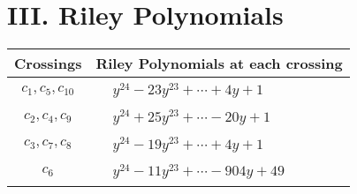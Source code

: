 \documentclass[1p]{elsarticle_modified}
\theoremstyle{definition}
\begin{document}
\centering \section*{ III. Riley Polynomials}
\begin{tabular}{m{50pt}|m{274pt}}
Crossings & \hspace{64pt}Riley Polynomials at each crossing \\
\hline $$\begin{aligned}c_{1},c_{5},c_{10}\end{aligned}$$&$\begin{aligned}
&y^{24}-23 y^{23}+\cdots+4 y+1
\end{aligned}$\\
\hline $$\begin{aligned}c_{2},c_{4},c_{9}\end{aligned}$$&$\begin{aligned}
&y^{24}+25 y^{23}+\cdots-20 y+1
\end{aligned}$\\
\hline $$\begin{aligned}c_{3},c_{7},c_{8}\end{aligned}$$&$\begin{aligned}
&y^{24}-19 y^{23}+\cdots+4 y+1
\end{aligned}$\\
\hline $$\begin{aligned}c_{6}\end{aligned}$$&$\begin{aligned}
&y^{24}-11 y^{23}+\cdots-904 y+49
\end{aligned}$\\
\hline
\end{tabular}
\vskip 2pc
\end{document}
